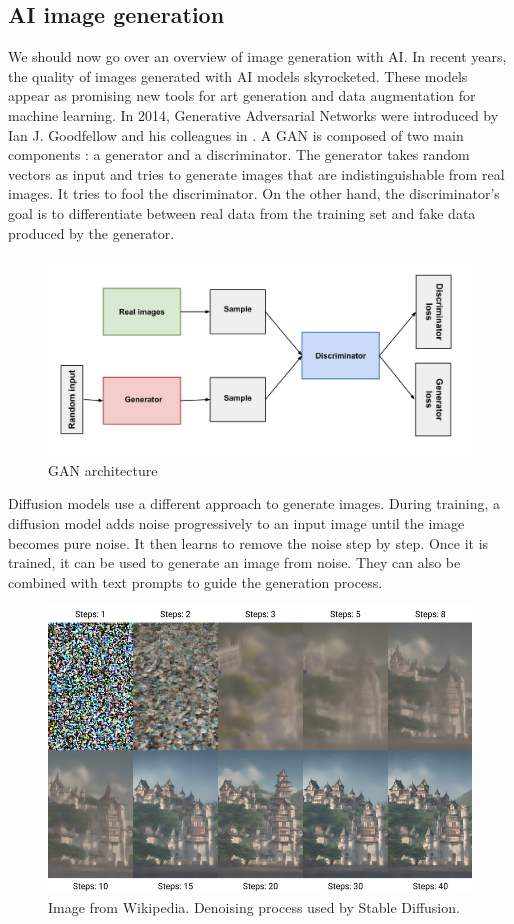 \documentclass[12pt,a4paper]{article}
\begin{document}
\subsection{AI image generation}
We should now go over an overview of image generation with AI. In recent years, the quality of images generated with AI models skyrocketed. These models appear as promising new tools for art generation and data augmentation for machine learning. In 2014, Generative Adversarial Networks were introduced by Ian J. Goodfellow and his colleagues in \autocite*{goodfellowGenerativeAdversarialNetworks2014}. A GAN is composed of two main components : a generator and a discriminator. The generator takes random vectors as input and tries to generate images that are indistinguishable from real images. It tries to fool the discriminator. On the other hand, the discriminator's goal is to differentiate between real data from the training set and fake data produced by the generator.
\begin{figure}[H]
    \centering
    \includegraphics[width=\textwidth]{img/GAN.png}
    \caption{GAN architecture}
\end{figure}

Diffusion models use a different approach to generate images. During training, a diffusion model adds noise progressively to an input image until the image becomes pure noise. It then learns to remove the noise step by step. Once it is trained, it can be used to generate an image from noise. They can also be combined with text prompts to guide the generation process.
\begin{figure}[H]
    \includegraphics*[width=\textwidth]{img/diffusion.png}
    \caption{Image from Wikipedia. Denoising process used by Stable Diffusion.}
\end{figure}
\end{document}

